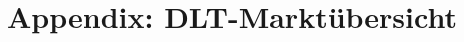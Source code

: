 %

\begin{adjustwidth}{-1.5in}{-1.5in}
\begin{center}

\end{center}
\end{adjustwidth}
\newpage


\chapter{Appendix: DLT-Marktübersicht}
\label{ch:appendix:dlts}

